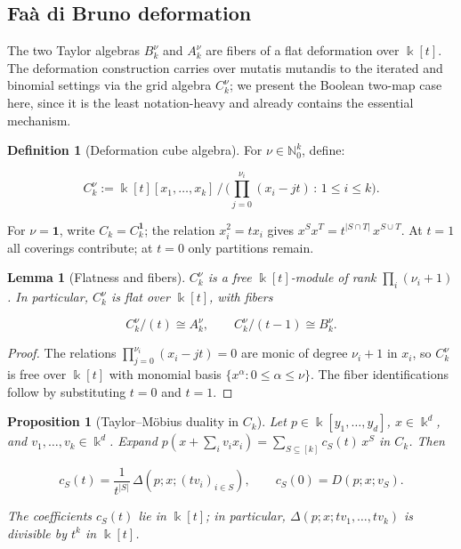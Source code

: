 \documentclass[10pt,a4paper]{article}
\theoremstyle{plain}
\newtheorem{lemma}[theorem]{Lemma}
\newtheorem{proposition}[theorem]{Proposition}
\theoremstyle{definition}
\newtheorem{definition}[theorem]{Definition}
\newcommand{\IN}{\mathbb{N}} %
\newcommand{\ik}{\Bbbk} %
\newcommand{\1}{\mathbb{1}} %
\newcommand{\set}[1]{\{#1\}} %
\begin{document}
\subsection{Faà di Bruno deformation}\label{fauxe0-di-bruno-deformation}

The two Taylor algebras \(B_k^\nu\) and \(A_k^\nu\) are fibers of a flat
deformation over \(\ik[t]\). The deformation construction carries over
mutatis mutandis to the iterated and binomial settings via the grid
algebra \(C_k^\nu\); we present the Boolean two-map case here, since it
is the least notation-heavy and already contains the essential
mechanism.

\begin{definition}[Deformation cube algebra]

\label{def:deformation-algebra} For \(\nu \in \IN_0^k\), define:

\[
  C_k^\nu := \ik[t][x_1, \dots, x_k] \,\big/\, \big({\textstyle\prod_{j=0}^{\nu_i}}(x_i - jt) \,:\, 1 \leq i \leq k\big).
\]

For \(\nu = \mathbf{1}\), write \(C_k = C_k^{\mathbf{1}}\); the relation
\(x_i^2 = tx_i\) gives \(x^S x^T = t^{|S \cap T|}\, x^{S \cup T}\). At
\(t = 1\) all coverings contribute; at \(t = 0\) only partitions remain.

\end{definition}

\begin{lemma}[Flatness and fibers]

\label{lem:flatness} \(C_k^\nu\) is a free \(\ik[t]\)-module of rank
\(\prod_i (\nu_i + 1)\). In particular, \(C_k^\nu\) is flat over
\(\ik[t]\), with fibers

\[
  C_k^\nu/(t) \cong A_k^\nu, \qquad C_k^\nu/(t-1) \cong B_k^\nu.
\]

\end{lemma}

\begin{proof}

The relations \(\prod_{j=0}^{\nu_i}(x_i - jt) = 0\) are monic of degree
\(\nu_i + 1\) in \(x_i\), so \(C_k^\nu\) is free over \(\ik[t]\) with
monomial basis \(\set{x^\alpha : 0 \leq \alpha \leq \nu}\). The fiber
identifications follow by substituting \(t = 0\) and \(t = 1\).

\end{proof}

\begin{proposition}[Taylor--Möbius duality in $C_k$]

\label{prop:deformation-taylor} Let \(p \in \ik[y_1, \dots, y_d]\),
\(x \in \ik^d\), and \(v_1, \dots, v_k \in \ik^d\). Expand
\(p(x + \sum_i v_i x_i) = \sum_{S \subseteq [k]} c_S(t)\, x^S\) in
\(C_k\). Then

\[
  c_S(t) = \frac{1}{t^{|S|}}\, \Delta(p; x; (tv_i)_{i \in S}), \qquad c_S(0) = D(p; x; v_S).
\]

The coefficients \(c_S(t)\) lie in \(\ik[t]\); in particular,
\(\Delta(p; x; tv_1, \dots, tv_k)\) is divisible by \(t^k\) in
\(\ik[t]\).

\end{proposition}
\end{document}
